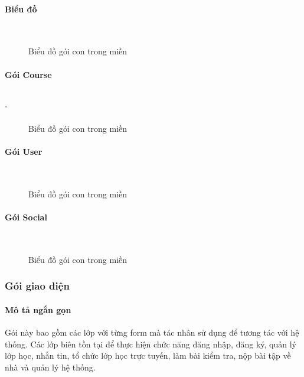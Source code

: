 \documentclass[./../main_file.tex]{subfiles}
\begin{document}
	\paragraph{Biểu đồ} ~\\
	\begin{figure}[htb]
		\centering
		\resizebox{0.5\textwidth}{!}{}
		\caption{Biểu đồ gói con trong miền}
	\end{figure}

	\paragraph{Gói Course} ~\\'
	\begin{figure}[H]
		\centering
		\resizebox{\textwidth}{!}{}
		\caption{Biểu đồ gói con trong miền}
	\end{figure}
		
	\paragraph{Gói User} ~\\
	\begin{figure}[H]
		\centering
		\resizebox{0.9\textwidth}{!}{}
		\caption{Biểu đồ gói con trong miền}
	\end{figure}

	\paragraph{Gói Social}~\\
	\begin{figure}[H]
		\centering
		\resizebox{0.7\textwidth}{!}{}
		\caption{Biểu đồ gói con trong miền}
	\end{figure}
	
	\subsubsection{Gói giao diện}
	\paragraph{Mô tả ngắn gọn}
	Gói này bao gồm các lớp với từng form mà tác nhân sử dụng để tương tác với hệ thống. Các lớp biên tồn tại để thực hiện chức năng đăng nhập, đăng ký, quản lý lớp học, nhắn tin, tổ chức lớp học trực tuyến, làm bài kiểm tra, nộp bài tập về nhà và quản lý hệ thống.
\end{document}
